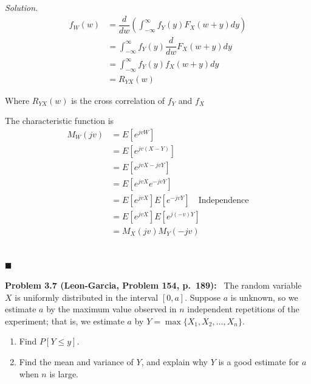 \documentclass[11pt]{article}
\newenvironment{problem}[1]
{\par\bigskip\noindent\textbf{Problem #1:}\ }
{\par}
\newenvironment{solution}
{\par\medskip\noindent\textit{Solution.}\ }
{\hfill$\blacksquare$\par\medskip}
\begin{document}
\begin{solution}
        \begin{align*}
            f_W(w) &= \dfrac{d}{dw} \left(\int_{-\infty}^{\infty} f_Y(y) F_X(w + y) dy\right) \\
            &= \int_{-\infty}^{\infty} f_Y(y) \dfrac{d}{dw} F_X(w + y) dy \\
            &= \int_{-\infty}^{\infty} f_Y(y) f_X(w + y) dy \\
            &= R_{YX}(w)
        \end{align*}

        Where $R_{YX}(w)$ is the cross correlation of $f_Y$ and $f_X$

        The characteristic function is
        \begin{align*}
            M_W(jv) &= E[e^{jvW}] \\
            &= E[e^{jv(X - Y)}] \\
            &= E[e^{jvX - jvY}] \\
            &= E[e^{jvX}e^{-jvY}] \\
            &= E[e^{jvX}]E[e^{-jvY}] \quad \text{Independence} \\
            &= E[e^{jvX}]E[e^{j(-v)Y}] \\
            &= M_X(jv)M_Y(-jv)
        \end{align*}

        \begin{align*}
        \end{align*}

    \end{solution}

    \begin{problem}{3.7 (Leon-Garcia, Problem 154, p.\ 189)}
The random variable $X$ is uniformly distributed in the interval $[0,a]$. Suppose
$a$ is unknown, so we estimate $a$ by the maximum value observed in $n$
independent repetitions of the experiment; that is, we estimate $a$ by
$Y = \max\{X_1, X_2, \ldots, X_n\}$.
\begin{enumerate}[label=(\alph*)]
  \item Find $P[Y \le y]$.
  \item Find the mean and variance of $Y$, and explain why $Y$ is a good estimate
  for $a$ when $n$ is large.
\end{enumerate}
    \end{problem}
\end{document}
